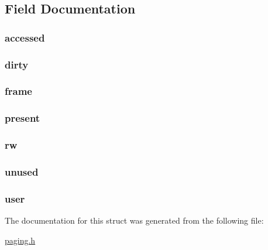 \subsection{Field Documentation}
\hypertarget{structpage_afb99a0327fa4c7332208a4c69586c8ec}{
\subsubsection[{accessed}]{ {\bf accessed}}}
\label{structpage_afb99a0327fa4c7332208a4c69586c8ec}
\hypertarget{structpage_a3a32ba260115f27563a8197f17c291a6}{
\subsubsection[{dirty}]{ {\bf dirty}}}
\label{structpage_a3a32ba260115f27563a8197f17c291a6}
\hypertarget{structpage_a2296b5820c02104f91cd25027910c8c0}{
\subsubsection[{frame}]{ {\bf frame}}}
\label{structpage_a2296b5820c02104f91cd25027910c8c0}
\hypertarget{structpage_a69718d61bbe7faf204d90744c9824c52}{
\subsubsection[{present}]{ {\bf present}}}
\label{structpage_a69718d61bbe7faf204d90744c9824c52}
\hypertarget{structpage_aee8462b2cc9476e2cc00f55889a8b8d6}{
\subsubsection[{rw}]{ {\bf rw}}}
\label{structpage_aee8462b2cc9476e2cc00f55889a8b8d6}
\hypertarget{structpage_ad9ac8c5c64c1eebd1789bcc17df7fb47}{
\subsubsection[{unused}]{ {\bf unused}}}
\label{structpage_ad9ac8c5c64c1eebd1789bcc17df7fb47}
\hypertarget{structpage_a9b87f54b0a35d500f320ab6f180e4f1c}{
\subsubsection[{user}]{ {\bf user}}}
\label{structpage_a9b87f54b0a35d500f320ab6f180e4f1c}


The documentation for this struct was generated from the following file:\begin{DoxyCompactItemize}
\item 
\hyperlink{paging_8h}{paging.h}\end{DoxyCompactItemize}
